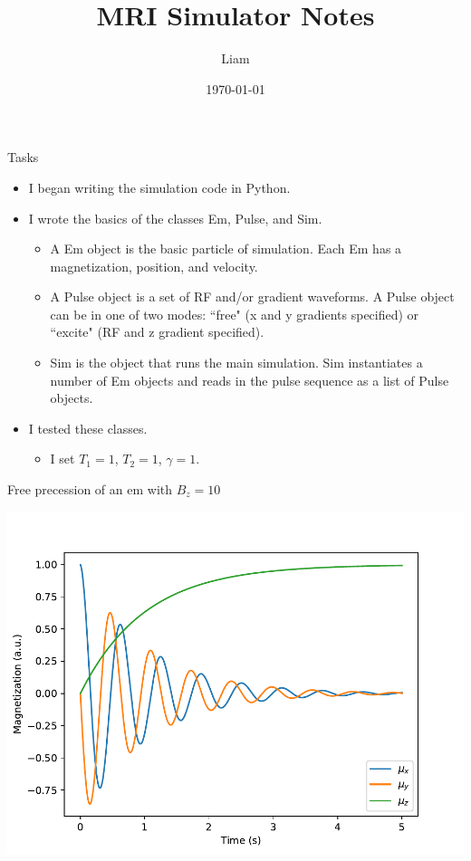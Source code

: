 \documentclass{beamer}
\title{MRI Simulator Notes}
\author{Liam}
\date{\today}
\begin{document}
\begin{frame}
\maketitle
\end{frame}

\begin{frame}{Tasks}
\begin{itemize}
\item I began writing the simulation code in Python.
\item I wrote the basics of the classes Em, Pulse, and Sim.
\begin{itemize}
\item A Em object is the basic particle of simulation. Each Em has a magnetization, position, and velocity.
\item A Pulse object is a set of RF and/or gradient waveforms. A Pulse object can be in one of two modes: ``free" (x and y gradients specified) or ``excite" (RF and z gradient specified).
\item Sim is the object that runs the main simulation. Sim instantiates a number of Em objects and reads in the pulse sequence as a list of Pulse objects.
\end{itemize}
\item I tested these classes.
\begin{itemize}
\item I set $T_1 = 1$, $T_2 = 1$, $\gamma = 1$.
\end{itemize}
\end{itemize}
\end{frame}

\begin{frame}{Free precession of an em with $B_z = 10$}
\begin{center}
\includegraphics[height=0.8\textheight]{free_precession_em_one}
\end{center}
\end{frame}
\end{document}

